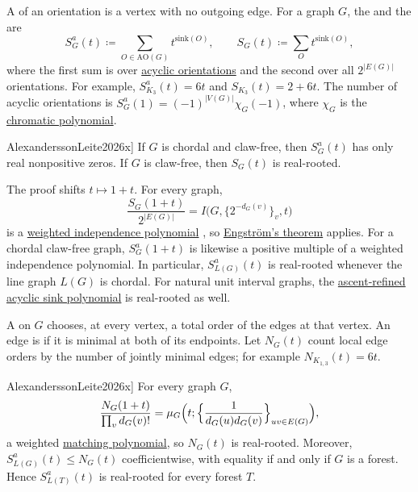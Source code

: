 A  of an orientation is a vertex with no outgoing edge.  For a
graph $G$, the  and the \label{sinkPolynomial} are
\[
 S^a_G(t)\coloneqq\sum_{O\in\mathrm{AO}(G)}t^{\mathrm{sink}(O)},
 \qquad
 S_G(t)\coloneqq\sum_{O}t^{\mathrm{sink}(O)},
\]
where the first sum is over \hyperref[acyclicOrientation]{acyclic
orientations} and the second over all $2^{|E(G)|}$ orientations.  For
example, $S^a_{K_3}(t)=6t$ and $S_{K_3}(t)=2+6t$.  The number of acyclic
orientations is $S^a_G(1)=(-1)^{|V(G)|}\chi_G(-1)$, where $\chi_G$ is the
\hyperref[chromaticPolynomial]{chromatic polynomial}.

\begin{theorem}[Alexandersson--Leite, \cite[Thm.~3.1 and Thm.~4.3]{AlexanderssonLeite2026x}]
If $G$ is chordal and claw-free, then $S^a_G(t)$ has only real nonpositive
zeros.  If $G$ is claw-free, then $S_G(t)$ is real-rooted.
\end{theorem}

The proof shifts $t\mapsto1+t$.  For every graph,
\[
 \frac{S_G(1+t)}{2^{|E(G)|}}
 =I\bigl(G,\{2^{-d_G(v)}\}_v,t\bigr)
\]
is a \hyperref[weightedIndependencePolynomial]{weighted independence
polynomial} \cite[Prop.~4.1]{AlexanderssonLeite2026x}, so
\hyperref[realRootedIndependence]{Engström's theorem} applies.  For a chordal
claw-free graph, $S^a_G(1+t)$ is likewise a positive multiple of a weighted
independence polynomial.  In particular, $S^a_{L(G)}(t)$ is real-rooted
whenever the line graph $L(G)$ is chordal.  For natural unit interval
graphs, the \hyperref[chromaticSinkRealRooted]{ascent-refined acyclic sink
polynomial} is real-rooted as well.

A  on $G$ chooses, at every vertex, a total order of
the edges at that vertex.  An edge is  if it is
minimal at both of its endpoints.  Let $N_G(t)$ count local edge orders by
the number of jointly minimal edges; for example $N_{K_{1,3}}(t)=6t$.

\begin{theorem}[Alexandersson--Leite, \cite[Thms.~3.8 and~3.16]{AlexanderssonLeite2026x}]
For every graph $G$,
\[
 \frac{N_G(1+t)}{\prod_{v}d_G(v)!}
 =\mu_G\Bigl(t;\Bigl\{\frac{1}{d_G(u)d_G(v)}\Bigr\}_{uv\in E(G)}\Bigr),
\]
a weighted \hyperref[matchingPolynomial]{matching polynomial}, so $N_G(t)$ is
real-rooted.  Moreover, $S^a_{L(G)}(t)\leq N_G(t)$ coefficientwise, with
equality if and only if $G$ is a forest.  Hence $S^a_{L(T)}(t)$ is real-rooted
for every forest $T$.
\end{theorem}

